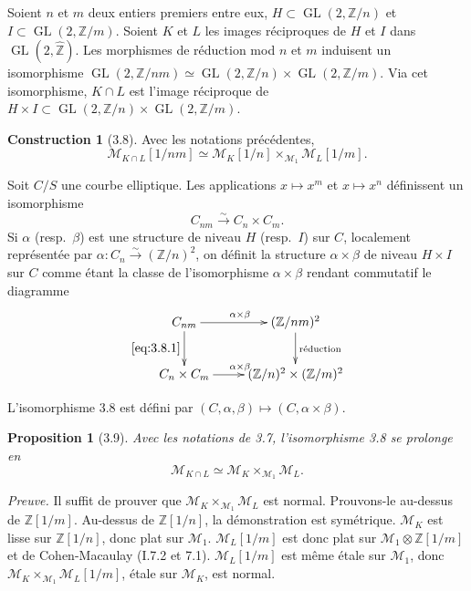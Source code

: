 \documentclass[11pt,a4paper]{amsart}
\theoremstyle{plain}
\newtheorem{proposition}[theorem]{Proposition}
\theoremstyle{definition}
\newtheorem{construction}[theorem]{Construction}
\DeclareMathOperator{\Gl}{GL}
\newcommand{\mll}{\mathcal{M}}
\newcommand{\ZZ}{\mathbb{Z}}
\begin{document}
\subsubsection{}
Soient $n$ et $m$ deux entiers premiers entre eux, $H \subset \Gl(2, \ZZ/n)$ et $I \subset \Gl(2, \ZZ/m)$. Soient $K$ et $L$ les images r\'eciproques de $H$ et $I$ dans $\Gl(2, \hat{\ZZ})$. Les morphismes de r\'eduction mod $n$ et $m$ induisent un isomorphisme $\Gl(2, \ZZ/nm) \simeq \Gl(2, \ZZ/n) \times \Gl(2, \ZZ/m)$. Via cet isomorphisme, $K \cap L$ est l'image r\'eciproque de $H \times I \subset \Gl(2, \ZZ/n) \times \Gl(2, \ZZ/m)$.

\begin{construction}[3.8]
Avec les notations pr\'ec\'edentes,
\[
\mll_{K \cap L}[1/nm] \simeq \mll_K[1/n] \times_{\mll_1} \mll_L[1/m].
\]
\end{construction}

Soit $C/S$ une courbe elliptique. Les applications $x \mapsto x^m$ et $x \mapsto x^n$ d\'efinissent un isomorphisme
\begin{equation}\label{eq:3.8.1}
C_{nm} \xrightarrow{\sim} C_n \times C_m.
\end{equation}
Si $\alpha$ (resp.\ $\beta$) est une structure de niveau $H$ (resp.\ $I$) sur $C$, localement repr\'esent\'ee par $\alpha \colon C_n \xrightarrow{\sim} (\ZZ/n)^2$, on d\'efinit la structure $\alpha \times \beta$ de niveau $H \times I$ sur $C$ comme \'etant la classe de l'isomorphisme $\alpha \times \beta$ rendant commutatif le diagramme
\[
\xymatrix{
C_{nm} \ar[r]^{\alpha \times \beta} \ar[d]_{\eqref{eq:3.8.1}} & (\ZZ/nm)^2 \ar[d]^{\text{r\'eduction}} \\
C_n \times C_m \ar[r]^{\alpha \times \beta} & (\ZZ/n)^2 \times (\ZZ/m)^2
}
\]

L'isomorphisme 3.8 est d\'efini par $(C, \alpha, \beta) \mapsto (C, \alpha \times \beta)$.

\begin{proposition}[3.9]
Avec les notations de 3.7, l'isomorphisme 3.8 se prolonge en
\begin{equation}\label{eq:3.9.1}
\mll_{K \cap L} \simeq \mll_K \times_{\mll_1} \mll_L.
\end{equation}
\end{proposition}

\noindent\textit{Preuve.} Il suffit de prouver que $\mll_K \times_{\mll_1} \mll_L$ est normal. Prouvons-le au-dessus de $\ZZ[1/m]$. Au-dessus de $\ZZ[1/n]$, la d\'emonstration est sym\'etrique. $\mll_K$ est lisse sur $\ZZ[1/n]$, donc plat sur $\mll_1$. $\mll_L[1/m]$ est donc plat sur $\mll_1 \otimes \ZZ[1/m]$ et de Cohen-Macaulay (I.7.2 et 7.1). $\mll_L[1/m]$ est m\^eme \'etale sur $\mll_1$, donc $\mll_K \times_{\mll_1} \mll_L[1/m]$, \'etale sur $\mll_K$, est normal.
\end{document}
